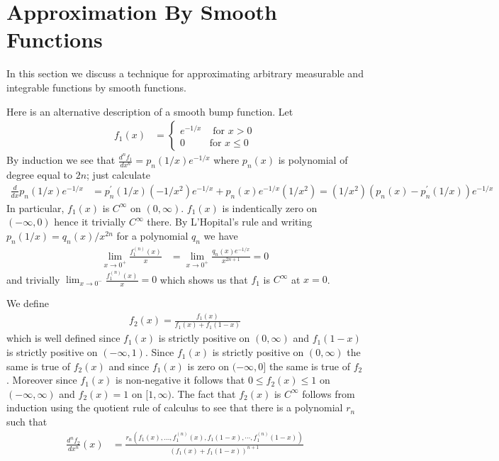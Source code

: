 \section{Approximation By Smooth Functions}
In this section we discuss a technique for approximating arbitrary
measurable and integrable functions by smooth functions.  

Here is an alternative description of a smooth bump function.
Let 
\begin{align*}
f_1(x)  &= \begin{cases}
e^{-1/x} & \text{ for $x>0$} \\
0 & \text{for $x \leq 0$}
\end{cases}
\end{align*}
By induction we see that $\frac{d^n f_1}{dx^n} = p_n(1/x) e^{-1/x}$ where
$p_n(x)$ is polynomial of degree equal to $2n$; just calculate
\begin{align*}
\frac{d}{dx} p_n(1/x) e^{-1/x} &= p^\prime_n(1/x) (-1/x^2) e^{-1/x} + p_n(x) e^{-1/x} (1/x^2) = (1/x^2)(p_n(x) - p^\prime_n(1/x)) e^{-1/x}
\end{align*}
In particular, $f_1(x)$ is $C^\infty$ on $(0,\infty)$.  $f_1(x)$ is indentically zero on $(-\infty,0)$ hence it trivially $C^\infty$ there.
By L'Hopital's rule and writing $p_n(1/x) = q_n(x)/x^{2n}$ for a polynomial $q_n$ we have 
\begin{align*}
\lim_{x \to 0^+} \frac{f^{(n)}_1(x)}{x} &= \lim_{x \to 0^+} \frac{q_n(x) e^{-1/x}}{x^{2n+1}} = 0
\end{align*}
and trivially $\lim_{x \to 0^-} \frac{f^{(n)}_1(x)}{x} =0$ which shows us that $f_1$ is $C^\infty$ at $x=0$.

We define
\begin{align*}
f_2(x) = \frac{f_1(x)}{f_1(x) + f_1(1-x)}
\end{align*}
which is well defined since $f_1(x)$ is strictly positive on $(0,\infty)$ and $f_1(1-x)$ is strictly positive on $(-\infty,1)$.   Since $f_1(x)$ is strictly positive on $(0,\infty)$ 
the same is true of $f_2(x)$ and since $f_1(x)$ is zero on $(-\infty,0]$ the same is true of $f_2$.  Moreover since $f_1(x)$ is non-negative it follows that $0 \leq f_2(x) \leq 1$ on $(-\infty, \infty)$
and $f_2(x) = 1$ on $[1,\infty)$.  The fact that $f_2(x)$ is $C^\infty$ follows from induction using the quotient rule of calculus to see that there is a polynomial $r_n$ such that
\begin{align*}
\frac{d^n f_2}{dx^n}(x) &= \frac{r_n(f_1(x), \dotsc, f^{(n)}_1(x), f_1(1-x), \cdots, f^{(n)}_1(1-x))}{(f_1(x) + f_1(1-x))^{n+1}}
\end{align*}


